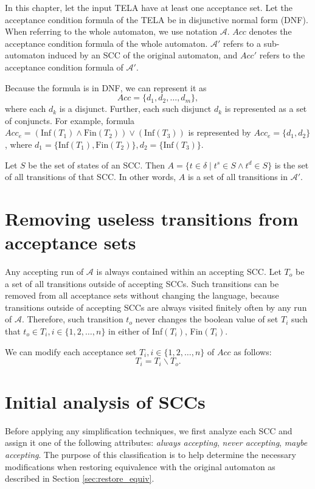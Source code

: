 \documentclass[
  digital, %
  twoside, %
  table,   %
  lof,     %
  lot,     %
]{fithesis3}
\begin{document}
In this chapter, let the input TELA have at least one acceptance set. Let the acceptance condition formula of the TELA be in disjunctive normal form (DNF). When referring to the whole automaton, we use notation $\mathcal{A}$. $Acc$ denotes the acceptance condition formula of the whole automaton. $\mathcal{A'}$ refers to a sub-automaton induced by an SCC of the original automaton, and $Acc'$ refers to the acceptance condition formula of $\mathcal{A'}$.

Because the formula is in DNF, we can represent it as 
\begin{equation*}
  Acc = \{d_1, d_2, \dots, d_m\},
\end{equation*}
where each $d_k$ is a disjunct. Further, each such disjunct $d_k$ is represented as a set of conjuncts. For example, formula $Acc_e = (\text{Inf}(T_1) \wedge \text{Fin}(T_2)) \vee (\text{Inf}(T_3))$ is represented by $Acc_e = \{d_1, d_2\}$, where $d_1 = \{\text{Inf}(T_1), \text{Fin}(T_2)\}, d_2 = \{\text{Inf}(T_3)\}$. 

Let $S$ be the set of states of an SCC. Then $A = \{t \in \delta \mid t^s \in S \wedge t^d \in S\}$ is the set of all transitions of that SCC. In other words, $A$ is a set of all transitions in $\mathcal{A'}$.

\section{Removing useless transitions from acceptance sets}
Any accepting run of $\mathcal{A}$ is always contained within an accepting SCC. Let $T_{o}$ be a set of all transitions outside of accepting SCCs. Such transitions can be removed from all acceptance sets without changing the language, because transitions outside of accepting SCCs are always visited finitely often by any run of $\mathcal{A}$. Therefore, such transition $t_{o}$ never changes the boolean value of set $T_i$ such that $t_{o} \in T_i, i \in \{1, 2, \dots, n\}$ in either of Inf$(T_i)$, Fin$(T_i)$.

We can modify each acceptance set $T_i, i \in \{1, 2, \dots, n\}$ of $Acc$ as follows:
\begin{equation*}
  T_i = T_i \smallsetminus T_{o}.
\end{equation*}

\section{Initial analysis of SCCs}
\label{sec:init_analysis}
Before applying any simplification techniques, we first analyze each SCC and assign it one of the following attributes: \emph{always accepting}, \emph{never accepting}, \emph{maybe accepting}. The purpose of this classification is to help determine the necessary modifications when restoring equivalence with the original automaton as described in Section \ref{sec:restore_equiv}. 
\end{document}
